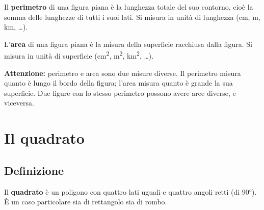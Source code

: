 \begin{definizione}
    Il \textbf{perimetro} di una figura piana è la lunghezza totale del suo contorno, cioè la somma delle lunghezze di tutti i suoi lati. Si misura in unità di lunghezza (cm, m, km, \ldots).
\end{definizione}

\begin{definizione}
    L'\textbf{area} di una figura piana è la misura della superficie racchiusa dalla figura. Si misura in unità di superficie (cm\textsuperscript{2}, m\textsuperscript{2}, km\textsuperscript{2}, \ldots).
\end{definizione}

\begin{attenzione}
    \textbf{Attenzione:} perimetro e area sono due misure diverse. Il perimetro misura quanto è lungo il bordo della figura; l'area misura quanto è grande la sua superficie. Due figure con lo stesso perimetro possono avere aree diverse, e viceversa.
\end{attenzione}

\section{Il quadrato}

\subsection{Definizione}

\begin{definizione}
    Il \textbf{quadrato} è un poligono con quattro lati uguali e quattro angoli retti (di 90°). È un caso particolare sia di rettangolo sia di rombo.
\end{definizione}

\begin{center}
\end{center}

